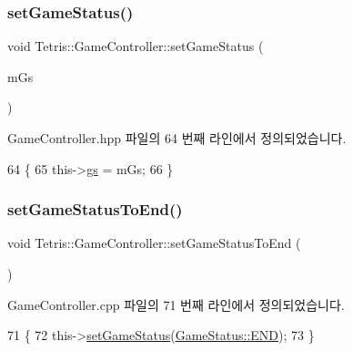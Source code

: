 \subsubsection{\texorpdfstring{set\+Game\+Status()}{setGameStatus()}\hspace{0.1cm}{\footnotesize\ttfamily [2/2]}}
{\footnotesize\ttfamily void Tetris\+::\+Game\+Controller\+::set\+Game\+Status (\begin{DoxyParamCaption}\item[{\hyperlink{class_tetris_1_1_game_controller_a96a963b56385f3b3a122ff0ca2beb770}{Game\+Status}}]{m\+Gs }\end{DoxyParamCaption})\hspace{0.3cm}{\ttfamily [inline]}}



Game\+Controller.\+hpp 파일의 64 번째 라인에서 정의되었습니다.


\begin{DoxyCode}
64                                               \{
65                 this->\hyperlink{class_tetris_1_1_game_controller_ae4c894005a82404c73a5a9a6efb208dc}{gs} = mGs;
66             \}
\end{DoxyCode}
\mbox{\label{class_tetris_1_1_game_controller_a3c5e6034b2e2faf70371a13eb5f9c5bb}} 
\subsubsection{\texorpdfstring{set\+Game\+Status\+To\+End()}{setGameStatusToEnd()}\hspace{0.1cm}{\footnotesize\ttfamily [1/2]}}
{\footnotesize\ttfamily void Tetris\+::\+Game\+Controller\+::set\+Game\+Status\+To\+End (\begin{DoxyParamCaption}{ }\end{DoxyParamCaption})}



Game\+Controller.\+cpp 파일의 71 번째 라인에서 정의되었습니다.


\begin{DoxyCode}
71                                            \{
72                 this->\hyperlink{class_tetris_1_1_game_controller_a013cef75ba09bdb7d95ae1df8497b8f5}{setGameStatus}(\hyperlink{class_tetris_1_1_game_controller_a96a963b56385f3b3a122ff0ca2beb770ab1a326c06d88bf042f73d70f50197905}{GameStatus::END});
73             \}
\end{DoxyCode}
\mbox{\label{class_tetris_1_1_game_controller_a3c5e6034b2e2faf70371a13eb5f9c5bb}} 
